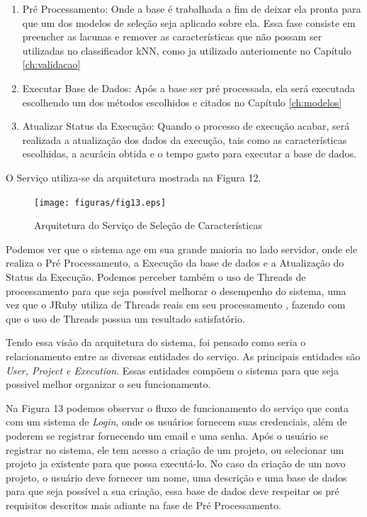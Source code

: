 \begin{enumerate}
	\item{Pré Processamento: Onde a base é trabalhada a fim de deixar ela pronta para que um dos modelos de seleção seja aplicado sobre ela. Essa fase consiste em preencher as lacunas e remover as características que não possam ser utilizadas no classificador kNN, como ja utilizado anteriomente no Capítulo \ref{ch:validacao}}
	\item{Executar Base de Dados: Após a base ser pré processada, ela será executada escolhendo um dos métodos escolhidos e citados no Capítulo \ref{ch:modelos}}
	\item{Atualizar Status da Execução: Quando o processo de execução acabar, será realizada a atualização dos dados da execução, tais como as características escolhidas, a acurácia obtida e o tempo gasto para executar a base de dados.}
\end{enumerate}

O Serviço utiliza-se da arquitetura mostrada na Figura 12.

\begin{figure}[h]
	\centering
		\texttt{[image: figuras/fig13.eps]}
	\caption{Arquitetura do Serviço de Seleção de Características}
	\label{fig:fig13}
\end{figure}

Podemos ver que o sistema age em sua grande maioria no lado servidor, onde ele realiza o Pré Processamento, a Execução da base de dados e a Atualização do Status da Execução. Podemos perceber também o uso de Threads de processamento para que seja possível melhorar o desempenho do sistema, uma vez que o JRuby utiliza de Threads reais em seu processamento \cite{jruby}, fazendo com que o uso de Threads possua um resultado satisfatório.

Tendo essa visão da arquitetura do sistema, foi pensado como seria o relacionamento entre as diversas entidades do serviço. As principais entidades são \textit{User, Project e Execution}. Essas entidades compõem o sistema para que seja possivel melhor organizar o seu funcionamento. 


Na Figura 13 podemos observar o fluxo de funcionamento do serviço que conta com um sistema de \textit{Login}, onde os usuários fornecem suas credenciais, além de poderem se registrar fornecendo um email e uma senha. Após o usuário se registrar no sistema, ele tem acesso a criação de um projeto, ou selecionar um projeto ja existente para que possa executá-lo. No caso da criação de um novo projeto, o usuário deve fornecer um nome, uma descrição e uma base de dados para que seja possível a sua criação, essa base de dados deve respeitar os pré requisitos descritos mais adiante na fase de Pré Processamento.


